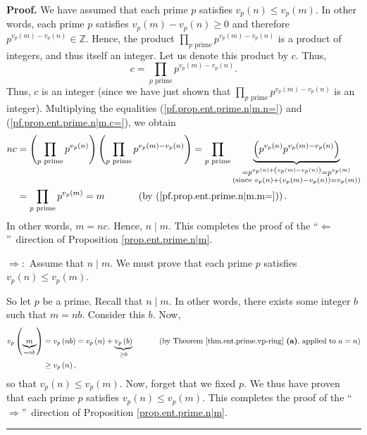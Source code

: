 \documentclass[numbers=enddot,12pt,final,onecolumn,notitlepage]{scrartcl}%
\numberwithin{exer}{subsection}
\theoremstyle{definition}
\newenvironment{proof}[1][Proof]{\noindent\textbf{#1.} }{\ \rule{0.5em}{0.5em}}
\let\prodnonlimits\prod
\renewcommand{\prod}{\prodnonlimits\limits}
\begin{document}
\begin{proof}
We have assumed that each prime $p$ satisfies $v_{p}\left(  n\right)  \leq
v_{p}\left(  m\right)  $. In other words, each prime $p$ satisfies
$v_{p}\left(  m\right)  -v_{p}\left(  n\right)  \geq0$ and therefore
$p^{v_{p}\left(  m\right)  -v_{p}\left(  n\right)  }\in\mathbb{Z}$. Hence, the
product $\prod_{p\text{ prime}}p^{v_{p}\left(  m\right)  -v_{p}\left(
n\right)  }$ is a product of integers, and thus itself an integer. Let us
denote this product by $c$. Thus,%
\begin{equation}
c=\prod_{p\text{ prime}}p^{v_{p}\left(  m\right)  -v_{p}\left(  n\right)  }.
\label{pf.prop.ent.prime.n|m.c=}%
\end{equation}
Thus, $c$ is an integer (since we have just shown that $\prod_{p\text{ prime}%
}p^{v_{p}\left(  m\right)  -v_{p}\left(  n\right)  }$ is an integer).
Multiplying the equalities (\ref{pf.prop.ent.prime.n|m.n=}) and
(\ref{pf.prop.ent.prime.n|m.c=}), we obtain%
\begin{align*}
nc  &  =\left(  \prod_{p\text{ prime}}p^{v_{p}\left(  n\right)  }\right)
\left(  \prod_{p\text{ prime}}p^{v_{p}\left(  m\right)  -v_{p}\left(
n\right)  }\right)  =\prod_{p\text{ prime}}\underbrace{\left(  p^{v_{p}\left(
n\right)  }p^{v_{p}\left(  m\right)  -v_{p}\left(  n\right)  }\right)
}_{\substack{=p^{v_{p}\left(  n\right)  +\left(  v_{p}\left(  m\right)
-v_{p}\left(  n\right)  \right)  }=p^{v_{p}\left(  m\right)  }\\\text{(since
}v_{p}\left(  n\right)  +\left(  v_{p}\left(  m\right)  -v_{p}\left(
n\right)  \right)  =v_{p}\left(  m\right)  \text{)}}}\\
&  =\prod_{p\text{ prime}}p^{v_{p}\left(  m\right)  }%
=m\ \ \ \ \ \ \ \ \ \ \left(  \text{by (\ref{pf.prop.ent.prime.n|m.m=}%
)}\right)  .
\end{align*}
In other words, $m=nc$. Hence, $n\mid m$. This completes the proof of the
\textquotedblleft$\Longleftarrow$\textquotedblright\ direction of Proposition
\ref{prop.ent.prime.n|m}.

$\Longrightarrow:$ Assume that $n\mid m$. We must prove that each prime $p$
satisfies $v_{p}\left(  n\right)  \leq v_{p}\left(  m\right)  $.

So let $p$ be a prime. Recall that $n\mid m$. In other words, there exists
some integer $b$ such that $m=nb$. Consider this $b$. Now,%
\begin{align*}
v_{p}\left(  \underbrace{m}_{=nb}\right)   &  =v_{p}\left(  nb\right)
=v_{p}\left(  n\right)  +\underbrace{v_{p}\left(  b\right)  }_{\geq
0}\ \ \ \ \ \ \ \ \ \ \left(  \text{by Theorem \ref{thm.ent.prime.vp-ring}
\textbf{(a)}, applied to }a=n\right) \\
&  \geq v_{p}\left(  n\right)  ,
\end{align*}
so that $v_{p}\left(  n\right)  \leq v_{p}\left(  m\right)  $. Now, forget
that we fixed $p$. We thus have proven that each prime $p$ satisfies
$v_{p}\left(  n\right)  \leq v_{p}\left(  m\right)  $. This completes the
proof of the \textquotedblleft$\Longrightarrow$\textquotedblright\ direction
of Proposition \ref{prop.ent.prime.n|m}.
\end{proof}
\end{document}
